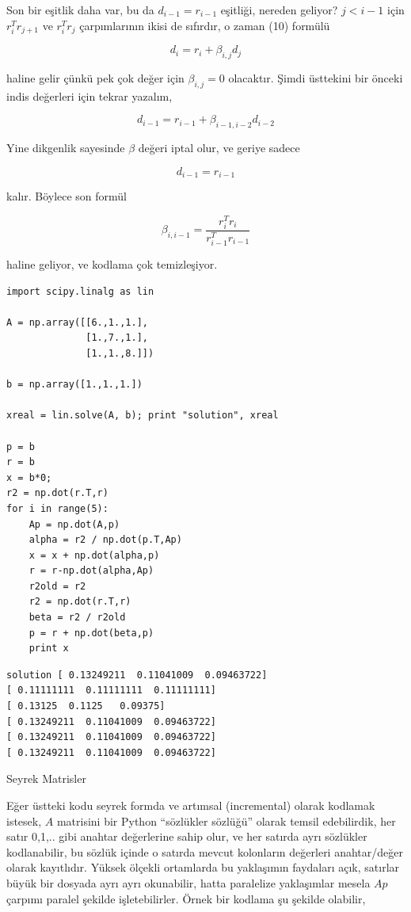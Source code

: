 \documentclass[12pt,fleqn]{article}\usepackage{../../common}
\begin{document}
Son bir eşitlik daha var, bu da $d_{i-1} = r_{i-1}$ eşitliği, nereden
geliyor?  $j < i-1$ için $r_i^Tr_{j+1}$ ve $r_i^Tr_{j}$ çarpımlarının ikisi
de sıfırdır, o zaman (10) formülü

$$ d_i = r_i + \beta_{i,j}d_j $$

haline gelir çünkü pek çok değer için $\beta_{i,j} = 0$ olacaktır. Şimdi
üsttekini bir önceki indis değerleri için tekrar yazalım,

$$ d_{i-1} = r_{i-1} + \beta_{i-1,i-2}d_{i-2} $$

Yine dikgenlik sayesinde $\beta$ değeri iptal olur, ve geriye sadece 

$$ d_{i-1} = r_{i-1} $$

kalır. Böylece son formül

$$  \beta_{i,i-1} = 
\frac{  r_i^Tr_i  }{r_{i-1}^Tr_{i-1}}
$$ 

haline geliyor, ve kodlama çok temizleşiyor. 

\begin{verbatim}
import scipy.linalg as lin

A = np.array([[6.,1.,1.],
              [1.,7.,1.],
              [1.,1.,8.]])

b = np.array([1.,1.,1.])

xreal = lin.solve(A, b); print "solution", xreal

p = b
r = b
x = b*0;
r2 = np.dot(r.T,r)
for i in range(5):
    Ap = np.dot(A,p)
    alpha = r2 / np.dot(p.T,Ap)
    x = x + np.dot(alpha,p)
    r = r-np.dot(alpha,Ap)
    r2old = r2
    r2 = np.dot(r.T,r)
    beta = r2 / r2old
    p = r + np.dot(beta,p)
    print x             
\end{verbatim}

\begin{verbatim}
solution [ 0.13249211  0.11041009  0.09463722]
[ 0.11111111  0.11111111  0.11111111]
[ 0.13125  0.1125   0.09375]
[ 0.13249211  0.11041009  0.09463722]
[ 0.13249211  0.11041009  0.09463722]
[ 0.13249211  0.11041009  0.09463722]
\end{verbatim}

Seyrek Matrisler

Eğer üstteki kodu seyrek formda ve artımsal (incremental) olarak kodlamak
istesek, $A$ matrisini bir Python ``sözlükler sözlüğü'' olarak temsil
edebilirdik, her satır 0,1,.. gibi anahtar değerlerine sahip olur, ve her
satırda ayrı sözlükler kodlanabilir, bu sözlük içinde o satırda mevcut
kolonların değerleri anahtar/değer olarak kayıtlıdır. Yüksek ölçekli ortamlarda
bu yaklaşımın faydaları açık, satırlar büyük bir dosyada ayrı ayrı okunabilir,
hatta paralelize yaklaşımlar mesela $A p$ çarpımı paralel şekilde
işletebilirler. Örnek bir kodlama şu şekilde olabilir,
\end{document}
